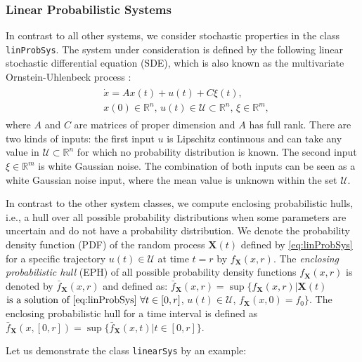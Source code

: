 \subsubsection{Linear Probabilistic Systems} \label{sec:linearProbSystems}

In contrast to all other systems, we consider stochastic properties in the class \texttt{linProbSys}. The system under consideration is defined by the following linear stochastic differential equation (SDE), which is also known as the multivariate Ornstein-Uhlenbeck process \cite{Gardiner1983}:
\begin{align}
\begin{split} \label{eq:linProbSys}
	&\dot{x} = A x(t) + u(t) + C \xi(t), \\
	&x(0) \in \mathbb{R}^{n}, \, u(t)\in \mathcal{U} \subset \mathbb{R}^n, \, \xi \in \mathbb{R}^{m},
\end{split}
\end{align} 
where $A$ and $C$ are matrices of proper dimension and $A$ has full rank. There are two kinds of inputs: the first input $u$ is Lipschitz continuous and can take any value in $\mathcal{U} \subset \mathbb{R}^n$ for which no probability distribution is known. The second input $\xi\in\mathbb{R}^m$ is white Gaussian noise. The combination of both inputs can be seen as a white Gaussian noise input, where the mean value is unknown within the set $\mathcal{U}$. 

In contrast to the other system classes, we compute enclosing probabilistic hulls, i.e., a hull over all possible probability distributions when some parameters are uncertain and do not have a probability distribution. We denote the probability density function (PDF) of the random process $\mathbf{X}(t)$ defined by \eqref{eq:linProbSys} for a specific trajectory $u(t) \in \mathcal{U}$ at time $t=r$ by $f_{\mathbf{X}}(x,r)$. The \textit{enclosing probabilistic hull} (EPH) of all possible probability density functions $f_{\mathbf{X}}(x,r)$ is denoted by $\bar{f}_{\mathbf{X}}(x,r)$ and defined as:
$\bar{f}_{\mathbf{X}}(x,r)=\sup\{f_{\mathbf{X}}(x,r) | \mathbf{X}(t)$ $ \text{is a solution of \eqref{eq:linProbSys} } \forall t\in[0,r]$, $u(t)\in \mathcal{U}$, $f_{\mathbf{X}}(x,0)=f_0 \}$.
The enclosing probabilistic hull for a time interval is defined as $\bar{f}_{\mathbf{X}}(x,[0,r])=\sup\{\bar{f}_{\mathbf{X}}(x,t)|t\in[0,r]\}$. 

Let us demonstrate the class \texttt{linearSys} by an example:

